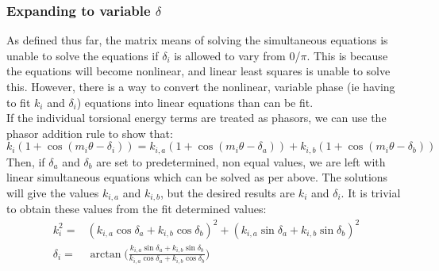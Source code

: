\documentclass[11pt, oneside, draft]{article}   	%
\begin{document}
\subsubsection{Expanding to variable $\delta$}
As defined thus far, the matrix means of solving the simultaneous equations is unable to solve the equations if $\delta_{i}$ is allowed to vary from 0/$\pi$. This is because the equations will become nonlinear, and linear least squares is unable to solve this. However, there is a way to convert the nonlinear, variable phase (ie having to fit $k_{i}$ and $\delta_{i}$) equations into linear equations than can be fit.\\
If the individual torsional energy terms are treated as phasors, we can use the phasor addition rule to show that:
\begin{equation}
k_{i}(1 + \cos(m_{i}\theta - \delta_{i})) = k_{i,a}(1 + \cos(m_{i}\theta - \delta_{a})) + k_{i,b}(1 + \cos(m_{i}\theta - \delta_{b}))
\end{equation}
Then, if $\delta_{a}$ and $\delta_{b}$ are set to predetermined, non equal values, we are left with linear simultaneous equations which can be solved as per above. The solutions will give the values $k_{i,a}$ and $k_{i,b}$, but the desired results are $k_{i}$ and $\delta_{i}$. It is trivial to obtain these values from the fit determined values:
\begin{eqnarray}
k_{i}^2  = & (k_{i,a}\cos\delta_{a} + k_{i,b}\cos\delta_{b})^2 + (k_{i,a}\sin\delta_{a} + k_{i,b}\sin\delta_{b})^2\\
\delta_{i} = & \arctan\Big(\frac{k_{i,a}\sin\delta_{a} + k_{i,b}\sin\delta_{b}}{k_{i,a}\cos\delta_{a} + k_{i,b}\cos\delta_{b}}\Big)
\end{eqnarray}
\end{document}
